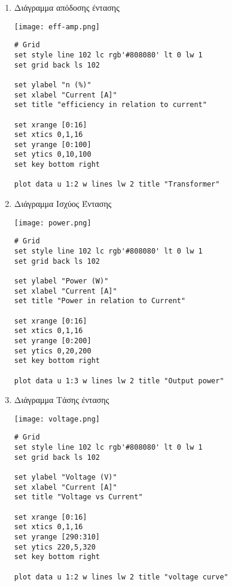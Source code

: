 \documentclass[11pt]{article}
\begin{document}
\begin{enumerate}
\item Διάγραμμα απόδοσης έντασης
\label{sec:org79696c7}

\begin{center}
\texttt{[image: eff-amp.png]}
\end{center}

\begin{verbatim}
# Grid
set style line 102 lc rgb'#808080' lt 0 lw 1
set grid back ls 102

set ylabel "n (%)"
set xlabel "Current [A]"
set title "efficiency in relation to current"

set xrange [0:16]
set xtics 0,1,16
set yrange [0:100]
set ytics 0,10,100
set key bottom right

plot data u 1:2 w lines lw 2 title "Transformer"
\end{verbatim}



\item Διάγραμμα Ισχύος Έντασης
\label{sec:orgcc33fc8}

\begin{center}
\texttt{[image: power.png]}
\end{center}

\begin{verbatim}
# Grid
set style line 102 lc rgb'#808080' lt 0 lw 1
set grid back ls 102

set ylabel "Power (W)"
set xlabel "Current [A]"
set title "Power in relation to Current"

set xrange [0:16]
set xtics 0,1,16
set yrange [0:200]
set ytics 0,20,200
set key bottom right

plot data u 1:3 w lines lw 2 title "Output power"
\end{verbatim}




\item Διάγραμμα Τάσης έντασης
\label{sec:org6c2909f}

\begin{center}
\texttt{[image: voltage.png]}
\end{center}

\begin{verbatim}
# Grid
set style line 102 lc rgb'#808080' lt 0 lw 1
set grid back ls 102

set ylabel "Voltage (V)"
set xlabel "Current [A]"
set title "Voltage vs Current"

set xrange [0:16]
set xtics 0,1,16
set yrange [290:310]
set ytics 220,5,320
set key bottom right

plot data u 1:2 w lines lw 2 title "voltage curve"
\end{verbatim}

\end{enumerate}
\end{document}
